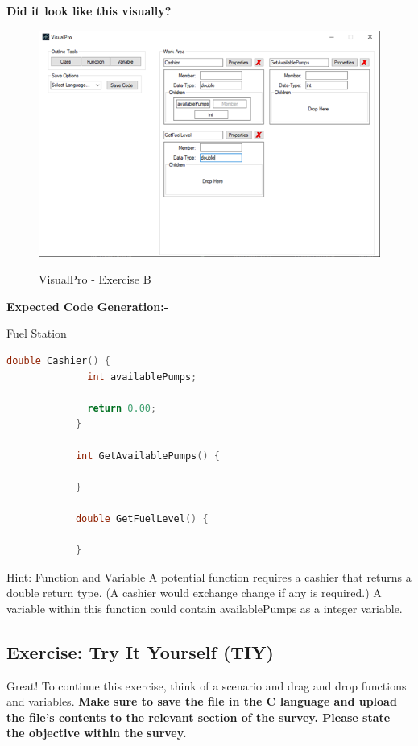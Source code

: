 \documentclass[10pt]{article}
\begin{document}
        \textbf{Did it look like this visually?}
          \begin{figure}[h]
            \centering
            {\includegraphics[scale=0.75]{Figures/Exercises/TutB-SecB-2.png}}
            \caption{VisualPro - Exercise B}
            \label{fig:vp-eB}
          \end{figure}

        \textbf{Expected Code Generation:-}
        \begin{example}{Fuel Station}
          \begin{lstlisting}[language=c]
            double Cashier() {
              int availablePumps;

              return 0.00;
            }

            int GetAvailablePumps() {

            }

            double GetFuelLevel() {

            }
          \end{lstlisting}
        \end{example}

        \begin{tip}{Hint: Function and Variable}
          A potential function requires a cashier that returns a double return type. (A cashier would exchange change if any is required.) A variable within this function could contain availablePumps as a integer variable.
        \end{tip}
    \subsection{Exercise: Try It Yourself (TIY)}
        Great! To continue this exercise, think of a scenario and drag and drop functions and variables.
        \textbf{Make sure to save the file in the C language and upload the file's contents to the relevant section of the survey. Please state the objective within the survey.}
\end{document}
